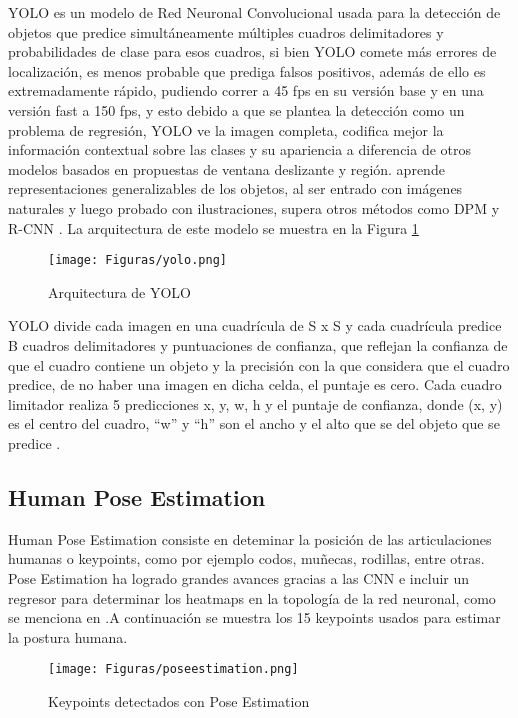 \documentclass[conference]{IEEEtran}
\begin{document}
YOLO es un modelo de Red Neuronal Convolucional usada para la detección de objetos que predice simultáneamente múltiples cuadros delimitadores y probabilidades de clase para esos cuadros, si bien YOLO comete más errores de localización, es menos probable que prediga falsos positivos, además de ello es extremadamente rápido, pudiendo correr a 45 fps en su versión base y en una versión fast a 150 fps, y esto debido a que se plantea la detección como un problema de regresión, YOLO ve la imagen completa, codifica mejor la información contextual sobre las clases y su apariencia a diferencia de otros modelos basados en propuestas de ventana deslizante y región. aprende representaciones generalizables de los objetos, al ser entrado con imágenes naturales y luego probado con ilustraciones, supera otros métodos como DPM y R-CNN \cite{redmon2018yolov3}. La arquitectura de este modelo se muestra en la Figura \ref{fig:yolo}

\begin{figure}[hbtp]
\centering
\texttt{[image: Figuras/yolo.png]}
\caption{Arquitectura de YOLO}
\label{fig:yolo}
\end{figure}

YOLO divide cada imagen en una cuadrícula de S x S y cada cuadrícula predice B cuadros delimitadores y puntuaciones de confianza, que reflejan la confianza de que el cuadro contiene un objeto y la precisión con la que considera que el cuadro predice, de no haber una imagen en dicha celda, el puntaje es cero. Cada cuadro limitador realiza 5 predicciones x, y, w, h y el puntaje de confianza, donde (x, y) es el centro del cuadro, “w” y “h” son el ancho y el alto que se del objeto que se predice \cite{redmon2018yolov3}.


\subsection{Human Pose Estimation}
Human Pose Estimation consiste en deteminar la posición de las articulaciones humanas o keypoints, como por ejemplo codos, muñecas, rodillas, entre otras. Pose Estimation ha logrado grandes avances gracias a las CNN e incluir un regresor para determinar los heatmaps en la topología de la red neuronal, como se menciona en \cite{bulat2016human}.A continuación se muestra los 15 keypoints usados para estimar la postura humana.

\begin{figure}[hbtp]
\centering
\texttt{[image: Figuras/poseestimation.png]}
\caption{Keypoints detectados con Pose Estimation}
\label{fig:poseestimation}
\end{figure}
\end{document}
